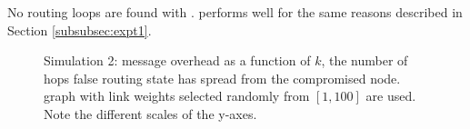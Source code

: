 No routing loops are found with \purges. \cpr performs well for the same reasons described in Section \ref{subsubsec:expt1}.  

\begin{figure}
\centering
{}
\caption{Simulation 2: message overhead as a function of $k$, the number of hops false routing state has spread from the compromised node.  \er graph with link weights selected 
randomly from $[1,100]$ are used.  Note the different scales of the y-axes.} 
\label{fig:msg-rand}
\end{figure}

